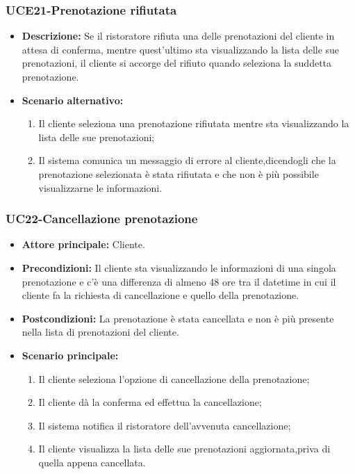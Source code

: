 \subsubsection{UCE21-Prenotazione rifiutata}
\begin{itemize}
    \item \textbf{Descrizione: }Se il ristoratore rifiuta una delle prenotazioni del cliente in attesa di conferma,
    mentre quest'ultimo sta visualizzando la lista delle sue prenotazioni, il cliente si accorge del rifiuto quando
    seleziona la suddetta prenotazione.
    \item \textbf{Scenario alternativo: }
    \begin{enumerate}
        \item Il cliente seleziona una prenotazione rifiutata mentre sta visualizzando la lista 
        delle sue prenotazioni;
        \item Il sistema comunica un messaggio di errore al cliente,dicendogli che la prenotazione selezionata 
        è stata rifiutata e che non è più possibile visualizzarne le informazioni.
    \end{enumerate}
\end{itemize}

\subsubsection{UC22-Cancellazione prenotazione}
\begin{itemize}
    \item \textbf{Attore principale: } Cliente.
    \item \textbf{Precondizioni: }Il cliente sta visualizzando le informazioni di una singola prenotazione
    e c'è una differenza di almeno 48 ore tra il datetime in cui il cliente fa la richiesta di cancellazione e quello della prenotazione.
    \item \textbf{Postcondizioni: }La prenotazione è stata cancellata e non è più presente nella lista di prenotazioni
    del cliente.
    \item \textbf{Scenario principale:} 
        \begin{enumerate}
            \item Il cliente seleziona l'opzione di cancellazione della prenotazione;
            \item Il cliente dà la conferma ed effettua la cancellazione;
            \item Il sistema notifica il ristoratore dell'avvenuta cancellazione;
            \item Il cliente visualizza la lista delle sue prenotazioni aggiornata,priva di quella appena
            cancellata.
        \end{enumerate}
\end{itemize}

